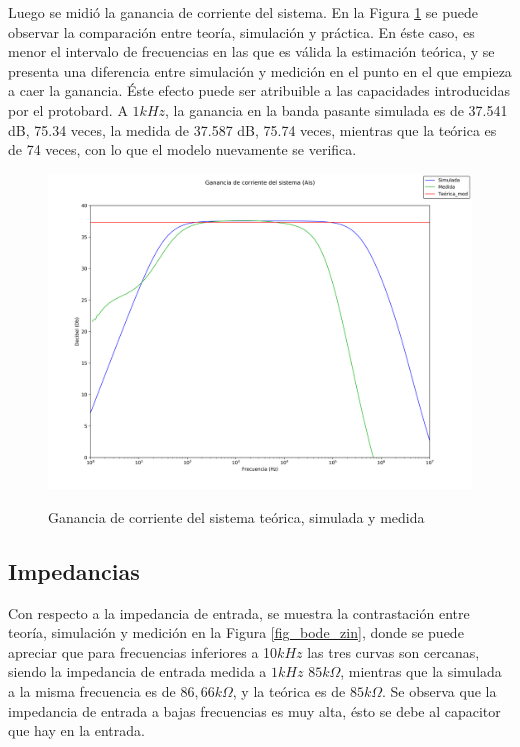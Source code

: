 Luego se midió la ganancia de corriente del sistema. En la Figura \ref{fig_bode_ais} se puede observar la comparación entre teoría, simulación y práctica. En éste caso, es menor el intervalo de frecuencias en las que es válida la estimación teórica, y se presenta una diferencia entre simulación y medición en el punto en el que empieza a caer la ganancia. Éste efecto puede ser atribuible a las capacidades introducidas por el protobard. A $1kHz$, la ganancia en la banda pasante simulada es de 37.541 dB, 75.34 veces, la medida de 37.587 dB, 75.74 veces, mientras que la teórica es de 74 veces, con lo que el modelo nuevamente se verifica. 

	\begin{figure}[H]
		\centering
		\includegraphics[scale=0.3]{./Imagenes/bode_Ais.png} \\
		\caption{Ganancia de corriente del sistema teórica, simulada y medida}
		\label{fig_bode_ais}
	\end{figure}

\subsection{Impedancias}
Con respecto a la impedancia de entrada, se muestra la contrastación entre teoría, simulación y medición en la Figura \ref{fig_bode_zin}, donde se puede apreciar que para frecuencias inferiores a 10$kHz$ las tres curvas son cercanas, siendo la impedancia de entrada medida a 
$1kHz$ $85k\Omega$, mientras que la simulada a la misma frecuencia es de $86,66 k\Omega$, y la teórica es de $85k\Omega$. Se observa que la impedancia de entrada a bajas frecuencias es muy alta, ésto se debe al capacitor que hay en la entrada. 

